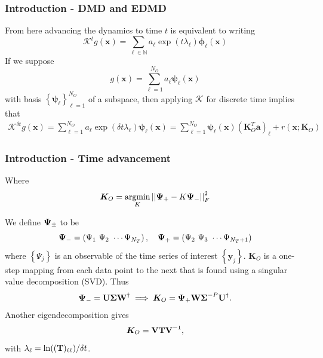 \documentclass[11pt,aspectratio=169]{beamer}
\newcommand{\norm}[1]{\left|\left|#1\right|\right|}
\newcommand{\parens}[1]{\left(#1\right)}
\newcommand{\bracks}[1]{\left\{#1\right\}}
\newcommand{\N}{\mathbb{N}}
\begin{document}
    \begin{frame}
        \frametitle{Introduction - DMD and EDMD}
        From here advancing the dynamics to time $t$ is equivalent to writing
        \begin{equation}
            \mathcal{K}^{t} g(\boldsymbol{x}) = \sum_{\ell \in \N} a_\ell 
            \exp(t\lambda_\ell)\boldsymbol{\phi}_\ell (\boldsymbol{x})
        \end{equation} 
        If we suppose 
        \begin{equation}
            g(\boldsymbol{x}) = \sum_{\ell = 1}^{N_O} a_\ell \boldsymbol{\psi}_\ell
            (\boldsymbol{x}) 
        \end{equation}
        with basis $\bracks{\boldsymbol{\psi}_\ell}_{\ell=1}^{N_O}$ of a subspace, 
        then applying $\mathcal{K}$ for discrete time implies that
        \begin{align} 
            \mathcal{K}^{\delta t} g(\boldsymbol{x}) = \sum_{\ell = 1}^{N_O} a_\ell 
            \exp(\delta t\lambda_\ell)\boldsymbol{\psi}_\ell (\boldsymbol{x})
            = \sum_{\ell = 1}^{N_O} \boldsymbol{\psi}_\ell (\boldsymbol{x})
            (\boldsymbol{K}_O^T
            \boldsymbol{a})_\ell + r(\boldsymbol{x};\boldsymbol{K}_O)
        \end{align}
    \end{frame}

    \begin{frame}
        \frametitle{Introduction - Time advancement}
        Where
        \begin{equation}
            \boldsymbol{K}_O = \underset{K}{\text{argmin}}\norm{{\bf\Psi}_+ - K{\bf\Psi}_-}_F^2
        \end{equation}

        We define ${\bf\Psi}_\pm$ to be
        \begin{equation}
            {\bf\Psi}_- = \parens{\Psi_1\ \Psi_2\ \cdots \Psi_{N_T}},\quad {\bf\Psi}_+ = \parens{
            \Psi_2\ \Psi_3\ \cdots \Psi_{N_T+1}} 
        \end{equation}
        where $\bracks{\Psi_j}$ is an observable of the time series of interest 
        $\bracks{\boldsymbol{y}_j}$. $\boldsymbol{K}_O$ is a one-step mapping from each data point
        to the next that is found
        using a singular value decomposition (SVD). Thus
        \begin{equation}
            {\bf\Psi}_- = {\bf U\Sigma W}^{\dagger} \implies \boldsymbol{K}_O = 
            {\bf\Psi}_+{\bf W\Sigma}^{-P}{\bf U}^{\dagger}.
        \end{equation}
        Another eigendecomposition gives
        \begin{equation}
            \boldsymbol{K}_O = {\bf VTV}^{-1}, 
        \end{equation}
        with $\lambda_\ell = \ln(({\bf T})_{\ell\ell})/\delta t$.
    \end{frame}
\end{document}
